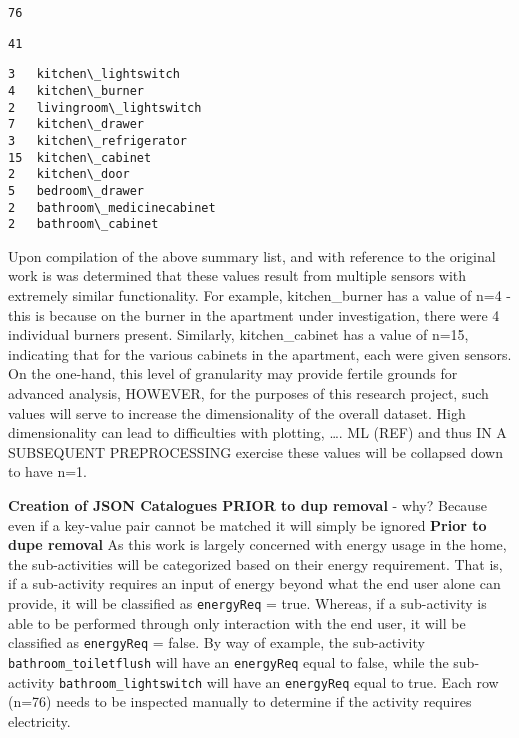 \documentclass[reprint, floatfix, groupaddress, prb]{revtex4-1}
\newcommand{\prompt}[4]{
        \llap{{\color{#2}[#3]: #4}}\vspace{-1.25em}
    }
\begin{document}
            \begin{tcolorbox}[breakable, boxrule=.5pt, size=fbox, pad at break*=1mm, opacityfill=0]
\prompt{Out}{outcolor}{9}{\hspace{3.5pt}}
\begin{Verbatim}[commandchars=\\\{\}]
76
\end{Verbatim}
\end{tcolorbox}
        

            \begin{tcolorbox}[breakable, boxrule=.5pt, size=fbox, pad at break*=1mm, opacityfill=0]
\prompt{Out}{outcolor}{10}{\hspace{3.5pt}}
\begin{Verbatim}[commandchars=\\\{\}]
41
\end{Verbatim}
\end{tcolorbox}
        

    \begin{Verbatim}[commandchars=\\\{\}]
3   kitchen\_lightswitch
4   kitchen\_burner
2   livingroom\_lightswitch
7   kitchen\_drawer
3   kitchen\_refrigerator
15  kitchen\_cabinet
2   kitchen\_door
5   bedroom\_drawer
2   bathroom\_medicinecabinet
2   bathroom\_cabinet
\end{Verbatim}

    Upon compilation of the above summary list, and with reference to the
original work is was determined that these values result from multiple
sensors with extremely similar functionality. For example,
kitchen\_burner has a value of n=4 - this is because on the burner in
the apartment under investigation, there were 4 individual burners
present. Similarly, kitchen\_cabinet has a value of n=15, indicating
that for the various cabinets in the apartment, each were given sensors.
On the one-hand, this level of granularity may provide fertile grounds
for advanced analysis, HOWEVER, for the purposes of this research
project, such values will serve to increase the dimensionality of the
overall dataset. High dimensionality can lead to difficulties with
plotting, \ldots. ML (REF) and thus IN A SUBSEQUENT PREPROCESSING
exercise these values will be collapsed down to have n=1.

\textbf{Creation of JSON Catalogues PRIOR to dup removal} - why? Because
even if a key-value pair cannot be matched it will simply be ignored
\textbf{Prior to dupe removal} As this work is largely concerned with
energy usage in the home, the sub-activities will be categorized based
on their energy requirement. That is, if a sub-activity requires an
input of energy beyond what the end user alone can provide, it will be
classified as \texttt{energyReq} = true. Whereas, if a sub-activity is
able to be performed through only interaction with the end user, it will
be classified as \texttt{energyReq} = false. By way of example, the
sub-activity \texttt{bathroom\_toiletflush} will have an
\texttt{energyReq} equal to false, while the sub-activity
\texttt{bathroom\_lightswitch} will have an \texttt{energyReq} equal to
true. Each row (n=76) needs to be inspected manually to determine if the
activity requires electricity.
\end{document}

